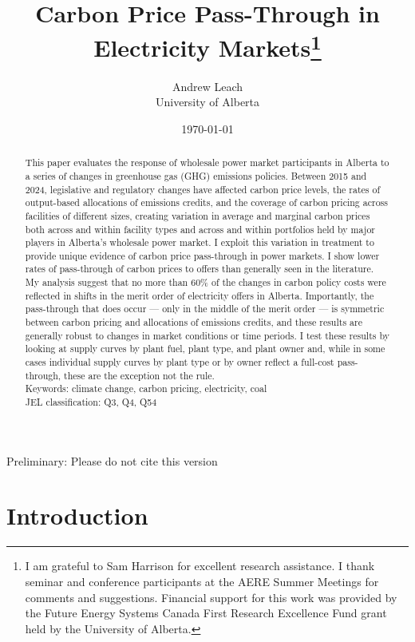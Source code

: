 \documentclass[12pt]{article}
\title{Carbon Price Pass-Through in Electricity Markets\thanks{I am grateful to Sam Harrison for excellent
research assistance. I thank seminar and conference participants at the AERE Summer Meetings for comments and suggestions. Financial support for this work was provided by the Future Energy Systems Canada First Research Excellence Fund grant held by the University of Alberta.}
}
\date{\today}
\author{Andrew Leach\\
 University of Alberta}
\begin{document}
\maketitle

\begin{center}
Preliminary: Please do not cite this version
\end{center}


\begin{abstract}
\noindent This paper evaluates the response of wholesale power market participants in Alberta to a series of changes in greenhouse gas (GHG) emissions policies. Between 2015 and 2024, legislative and regulatory changes have affected carbon price levels, the rates of output-based allocations of emissions credits, and the coverage of carbon pricing across facilities of different sizes, creating variation in average and marginal carbon prices both across and within facility types and across and within portfolios held by major players in Alberta's wholesale power market. I exploit this variation in treatment to provide unique evidence of carbon price pass-through in power markets. I show lower rates of pass-through of carbon prices to offers than generally seen in the literature. My analysis suggest that no more than 60\% of the changes in carbon policy costs were reflected in shifts in the merit order of electricity offers in Alberta. Importantly, the pass-through that does occur --- only in the middle of the merit order --- is symmetric between carbon pricing and allocations of emissions credits, and these results are generally robust to changes in market conditions or time periods. I test these results by looking at supply curves by plant fuel, plant type, and plant owner and, while in some cases individual supply curves by plant type or by owner reflect a full-cost pass-through, these are the exception not the rule.\\

\noindent Keywords: climate change, carbon pricing, electricity, coal\\
\noindent JEL classification: Q3, Q4, Q54
\end{abstract}

\thispagestyle{empty}
\newpage
\onehalfspacing


\section{Introduction}
\end{document}

